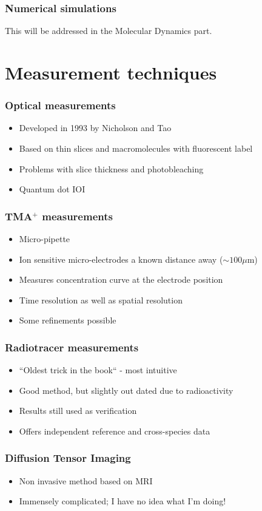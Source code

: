 \documentclass{beamer}
\begin{document}
 \begin{frame}
  \frametitle{Numerical simulations}
  This will be addressed in the Molecular Dynamics part.
 \end{frame}


\section{Measurement techniques}
 \begin{frame}
 \frametitle{Optical measurements}
 \begin{itemize}
  \item Developed in 1993 by Nicholson and Tao
  \item Based on thin slices and macromolecules with fluorescent label
  \item Problems with slice thickness and photobleaching
  \item Quantum dot IOI
 \end{itemize}
\end{frame}

 \begin{frame}
 \frametitle{TMA$^+$ measurements}
 \begin{itemize}
  \item Micro-pipette
  \item Ion sensitive micro-electrodes a known distance away ($\sim100\mu$m)
  \item Measures concentration curve at the electrode position
  \item Time resolution as well as spatial resolution
  \item Some refinements possible
 \end{itemize}
\end{frame}

 \begin{frame}
 \frametitle{Radiotracer measurements}
 \begin{itemize}
  \item ``Oldest trick in the book`` - most intuitive
  \item Good method, but slightly out dated due to radioactivity
  \item Results still used as verification
  \item Offers independent reference and cross-species data
 \end{itemize}

\end{frame}

 \begin{frame}
 \frametitle{Diffusion Tensor Imaging}
 \begin{itemize}
  \item Non invasive method based on MRI
  \item Immensely complicated; I have no idea what I'm doing!
 \end{itemize}

\end{frame}
\end{document}
